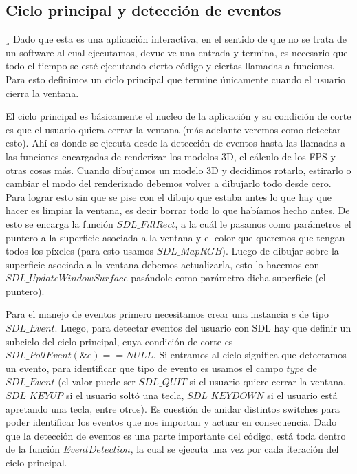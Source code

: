 \documentclass[a4paper]{article}
\newcounter{col}
\begin{document}
\subsection{Ciclo principal y detección de eventos}¸\label{ciclop}
Dado que esta es una aplicación interactiva, en el sentido de que no se trata de un software al cual ejecutamos, devuelve una entrada y termina, es necesario que todo el tiempo se esté ejecutando cierto código y ciertas llamadas a funciones. Para esto definimos un ciclo principal que termine únicamente cuando el usuario cierra la ventana. \par El ciclo principal es básicamente el nucleo de la aplicación y su condición de corte es que el usuario quiera cerrar la ventana (más adelante veremos como detectar esto). Ahí es donde se ejecuta desde la detección de eventos hasta las llamadas a las funciones encargadas de renderizar los modelos 3D, el cálculo de los FPS y otras cosas más. Cuando dibujamos un modelo 3D y decidimos rotarlo, estirarlo o cambiar el modo del renderizado debemos volver a dibujarlo todo desde cero. Para lograr esto sin que se pise con el dibujo que estaba antes lo que hay que hacer es limpiar la ventana, es decir borrar todo lo que habíamos hecho antes. De esto se encarga la función $SDL\_FillRect$, a la cuál le pasamos como parámetros el puntero a la superficie asociada a la ventana y el color que queremos que tengan todos los píxeles (para esto usamos $SDL\_MapRGB$). Luego de dibujar sobre la superficie asociada a la ventana debemos actualizarla, esto lo hacemos con $SDL\_UpdateWindowSurface$ pasándole como parámetro dicha superficie (el puntero).
\par Para el manejo de eventos primero necesitamos crear una instancia $e$ de tipo $SDL\_Event$. Luego, para detectar eventos del usuario con SDL hay que definir un subciclo del ciclo principal, cuya condición de corte es $SDL\_PollEvent(\&e) == NULL$. Si entramos al ciclo significa que detectamos un evento, para identificar que tipo de evento es usamos el campo $type$ de $SDL\_Event$ (el valor puede ser $SDL\_QUIT$ si el usuario quiere cerrar la ventana, $SDL\_KEYUP$ si el usuario soltó una tecla, $SDL\_KEYDOWN$ si el usuario está apretando una tecla, entre otros). Es cuestión de anidar distintos switches para poder identificar los eventos que nos importan y actuar en consecuencia. Dado que la detección de eventos es una parte importante del código, está toda dentro de la función $EventDetection$, la cual se ejecuta una vez por cada iteración del ciclo principal.
\end{document}
